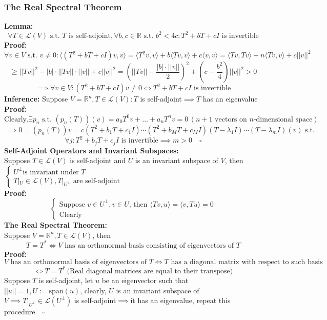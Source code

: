 \documentclass{article}
\newcommand{\R}{\mathbb{R}}
\newcommand{\st}{\mbox{ s.t. }}
\newcommand{\0}{{\bf{0}}}
\begin{document}
\subsubsection{The Real Spectral Theorem}
\textbf{Lemma:}
$$\forall T\in\mathcal{L}(V)\st T\mbox{ is self-adjoint},\forall b,c\in\R\st b^2<4c:T^2+bT+cI\mbox{ is invertible}$$
\textbf{Proof:}
$$\forall v\in V\st v\neq0:\langle(T^2+bT+cI)v,v\rangle=\langle T^2v,v\rangle+b\langle Tv,v\rangle+c\langle v,v\rangle=\langle Tv,Tv\rangle+n\langle Tv,v\rangle+c||v||^2$$
$$\geq||Tv||^2-|b|\cdot||Tv||\cdot||v||+c||v||^2=\left(||Tv||-\frac{|b|\cdot||v||}{2}\right)^2+\left(c-\frac{b^2}{4}\right)||v||^2>0$$
$$\implies\forall v\in V:(T^2+bT+cI)v\neq0\iff T^2+bT+cI\mbox{ is invertible}$$
\textbf{Inference:}
Suppose $V=\R^n,T\in\mathcal{L}(V):T$ is self-adjoint$\implies T$ has an eigenvalue\\
\textbf{Proof:}
$$\mbox{Clearly,}\exists p_n\st(p_n(T))(v)=a_0T^0v+\dots+a_nT^nv=0\,(n+1\mbox{ vectors on $n$-dimensional space})$$
$$\implies 0=(p_n(T))v=c\left(T^2+b_1T+c_1I\right)\cdots\left(T^2+b_MT+c_MI\right)(T-\lambda_1I)\cdots(T-\lambda_mI)(v)\st$$
$$\forall j:T^2+b_jT+c_jI\mbox{ is invertible}\implies m>0\quad\square$$
\textbf{Self-Adjoint Operators and Invariant Subspaces:}\\
Suppose $T\in\mathcal{L}(V)$ is self-adjoint and $U$ is an invariant subspace of $V$, then $\begin{cases}
    U^\perp\mbox{is invariant under }T\\
    T|_U\in\mathcal{L}(V),T|_{U^\perp}\mbox{ are self-adjoint}
\end{cases}$\\
\textbf{Proof:}
$$\begin{cases}
    \mbox{Suppose }v\in U^\perp,v\in U\mbox{, then }\langle Tv,u\rangle=\langle v,Tu\rangle=0\\
    \mbox{Clearly}
\end{cases}$$
\textbf{The Real Spectral Theorem:}\\
Suppose $V=\R^n,T\in\mathcal{L}(V)$, then
$$T=T^*\iff V\mbox{ has an orthonormal basis consisting of eigenvectors of }T$$
\textbf{Proof:}
$$V\mbox{ has an orthonormal basis of eigenvectors of }T\iff T\mbox{ has a diagonal matrix with respect to such basis}$$
$$\iff T=T^*\,\mbox{(Real diagonal matrices are equal to their transpose)}$$
Suppose $T$ is self-adjoint, let $u$ be an eigenvector such that $||u||=1,U:=\mbox{span}(u)$, clearly, $U$ is an invariant subspace of $V\implies T|_{U^\perp}\in\mathcal{L}(U^\perp)$ is self-adjoint$\implies$it has an eigenvalue, repeat this procedure$\quad\square$
\end{document}
